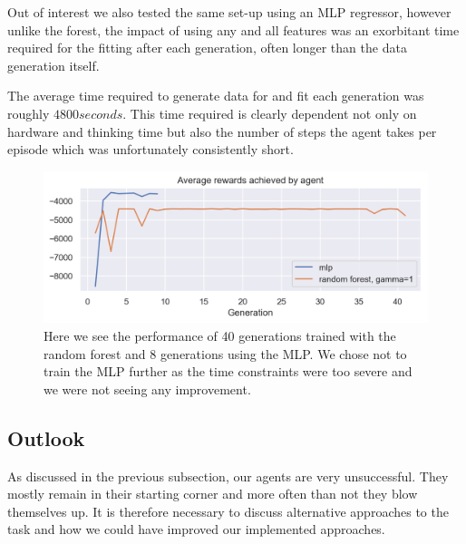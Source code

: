 Out of interest we also tested the same set-up using an MLP regressor, however unlike the forest, the impact of using any and all features was an exorbitant time required for the fitting after each generation, often longer than the data generation itself.

The average time required to generate data for and fit each generation was roughly $4800 seconds$. This time required is clearly dependent not only on hardware and thinking time but also the number of steps the agent takes per episode which was unfortunately consistently short.

\begin{figure}[h]
\centering
	\includegraphics[width=\linewidth]{images/mlp_vs_forest_gamma_1.png}
	\caption{Here we see the performance of 40 generations trained with the random forest and 8 generations using the MLP. We chose not to train the MLP further as the time constraints were too severe and we were not seeing any improvement.}
	\label{mlp_vs_forest_gamma_1.0}
\end{figure}



\subsection{Outlook}
As discussed in the previous subsection, our agents are very unsuccessful. They mostly remain in their starting corner and more often than not they blow themselves up. It is therefore necessary to discuss alternative approaches to the task and how we could have improved our implemented approaches.\par

